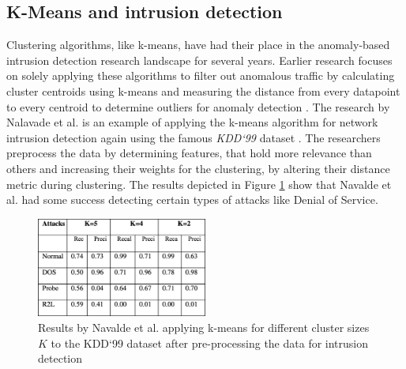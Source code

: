 \subsection{K-Means and intrusion detection}
\label{subsec:k_means_intrusion_detection}
Clustering algorithms, like k-means, have had their place in the anomaly-based intrusion detection research landscape for several years. Earlier research focuses on solely applying these algorithms to filter out anomalous traffic by calculating cluster centroids using k-means and measuring the distance from every datapoint to every centroid to determine outliers for anomaly detection \cite{munz2007traffic}. The research by Nalavade et al. \cite{nalavade2014} is an example of applying the k-means algorithm for network intrusion detection again using the famous \emph{KDD`99} dataset \cite{kdd1999}. The researchers preprocess the data by determining features, that hold more relevance than others and increasing their weights for the clustering, by altering their distance metric during clustering. The results depicted in Figure \ref{fig:k_means_navalde} show that Navalde et al. had some success detecting certain types of attacks like Denial of Service. 

\begin{figure}[H]
	\sffamily\footnotesize
	\includegraphics[width=0.5\textwidth]{pic/navalde_k_means.png}
	\unitlength=0.75mm
	\linethickness{0.4pt}
	\caption{Results by Navalde et al. applying k-means for different cluster sizes $K$ to the KDD`99 dataset after pre-processing the data for intrusion detection \cite{nalavade2014}}
	\label{fig:k_means_navalde}
\end{figure}


